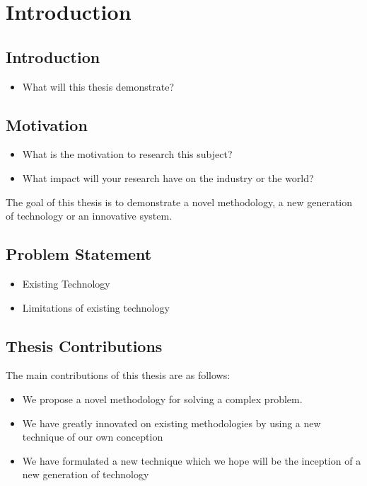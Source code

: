 
\glsresetall %
\chapter[Introduction]{Introduction}\label{ch:Introduction}

\section{Introduction}
\singlespacing
\begin{itemize}
	\item{What will this thesis demonstrate?}
\end{itemize}
\doublespacing

\section{Motivation}
\singlespacing
\begin{itemize}
	\item{What is the motivation to research this subject?}
	\item{What impact will your research have on the industry or the world?}
\end{itemize}
\doublespacing

The goal of this thesis is to demonstrate a novel methodology, a new generation of technology or an innovative system.  

\section{Problem Statement}
\singlespacing
\begin{itemize}
	\item{Existing Technology}
	\item{Limitations of existing technology}
\end{itemize}
\doublespacing

\section[Contributions]{Thesis Contributions}
The main contributions of this thesis are as follows:
\singlespacing
\begin{itemize}
	\item{We propose a novel methodology for solving a complex problem.}
	\item{We have greatly innovated on existing methodologies by using a new technique of our own conception}
	\item{We have formulated a new technique which we hope will be the inception of a new generation of technology}
\end{itemize}
\doublespacing


